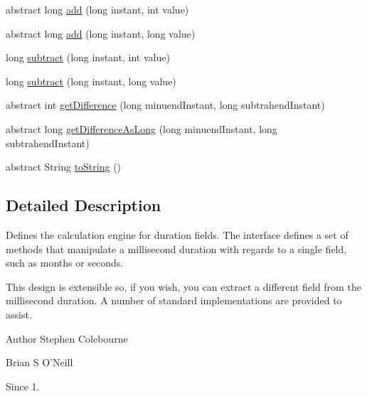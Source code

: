 \begin{DoxyCompactItemize}
\item 
abstract long \hyperlink{classorg_1_1joda_1_1time_1_1_duration_field_a58f09e9221db948139e50409d41232b0}{add} (long instant, int value)
\item 
abstract long \hyperlink{classorg_1_1joda_1_1time_1_1_duration_field_a000a12da2e921d98e8fb19181193e574}{add} (long instant, long value)
\item 
long \hyperlink{classorg_1_1joda_1_1time_1_1_duration_field_a3f6fc0c9228664d657cd809954661b16}{subtract} (long instant, int value)
\item 
long \hyperlink{classorg_1_1joda_1_1time_1_1_duration_field_a7f1983460a11b1d50d36908a8a4c7c76}{subtract} (long instant, long value)
\item 
abstract int \hyperlink{classorg_1_1joda_1_1time_1_1_duration_field_a52ca2db6b49f2038a12f0014f2eb293f}{get\-Difference} (long minuend\-Instant, long subtrahend\-Instant)
\item 
abstract long \hyperlink{classorg_1_1joda_1_1time_1_1_duration_field_a50d0b7dedeae16b29df3a9ab0ba15295}{get\-Difference\-As\-Long} (long minuend\-Instant, long subtrahend\-Instant)
\item 
abstract String \hyperlink{classorg_1_1joda_1_1time_1_1_duration_field_aaa417cdb32c44747df3f8d8e482caf61}{to\-String} ()
\end{DoxyCompactItemize}


\subsection{Detailed Description}
Defines the calculation engine for duration fields. The interface defines a set of methods that manipulate a millisecond duration with regards to a single field, such as months or seconds. 

This design is extensible so, if you wish, you can extract a different field from the millisecond duration. A number of standard implementations are provided to assist.

\begin{DoxyAuthor}{Author}
Stephen Colebourne 

Brian S O'Neill 
\end{DoxyAuthor}
\begin{DoxySince}{Since}
1. 
\end{DoxySince}


